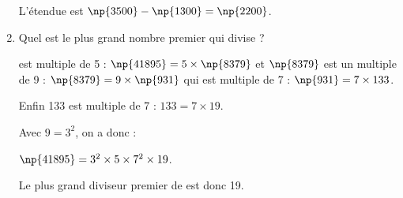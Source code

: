 \begin{enumerate}
L'étendue est $\np{3500} - \np{1300} = \np{2200}$.
\item Quel est le plus grand nombre premier qui divise  ?

 est multiple de 5 : $\np{41895} = 5 \times \np{8379}$ et $\np{8379}$ est un multiple de 9 : $\np{8379} = 9 \times \np{931}$ qui est  multiple de 7 : $\np{931} = 7 \times 133$.

Enfin 133 est multiple de 7  : $133 = 7 \times 19$.

Avec $9 = 3^2$, on a donc :

$\np{41895} = 3^2 \times 5 \times 7^2 \times 19$.

Le plus grand diviseur premier de  est donc 19.
\end{enumerate}

\vspace{0.5cm}

